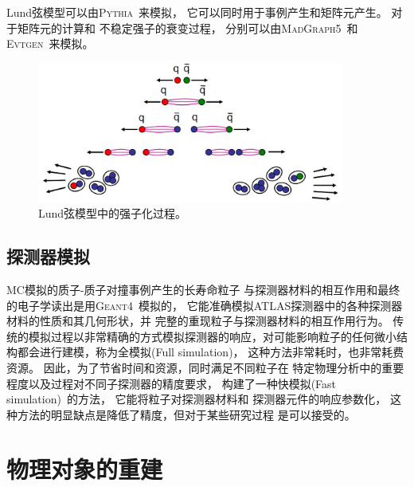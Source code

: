 Lund弦模型可以由\textsc{Pythia}~\cite{MC5}来模拟，
它可以同时用于事例产生和矩阵元产生。
对于矩阵元的计算和
不稳定强子的衰变过程，
分别可以由\textsc{MadGraph5}~\cite{Alwall:2014hca}和\textsc{Evtgen}~\cite{Lange:2001uf}来模拟。

\begin{figure}
  \begin{center}
    \includegraphics[width=0.9\textwidth]{figuresEXP/MC1.jpg}
  \end{center}
  \caption{
Lund弦模型中的强子化过程。
  }
    \label{fig:MC1}
\end{figure}


\subsection{探测器模拟}
\label{sec:MCDET}

MC模拟的质子-质子对撞事例产生的长寿命粒子
与探测器材料的相互作用和最终的电子学读出是用\textsc{Geant4}~\cite{MC7}模拟的，
它能准确模拟ATLAS探测器中的各种探测器材料的性质和其几何形状，并
完整的重现粒子与探测器材料的相互作用行为。
传统的模拟过程以非常精确的方式模拟探测器的响应，对可能影响粒子的任何微小结构都会进行建模，称为全模拟(Full simulation)，
这种方法非常耗时，也非常耗费资源。
因此，为了节省时间和资源，同时满足不同粒子在
特定物理分析中的重要程度以及过程对不同子探测器的精度要求，
构建了一种快模拟(Fast simulation)~\cite{MC8}的方法，
它能将粒子对探测器材料和
探测器元件的响应参数化，
这种方法的明显缺点是降低了精度，但对于某些研究过程
是可以接受的。


\section{物理对象的重建}
\label{sec:Reconstruction}

